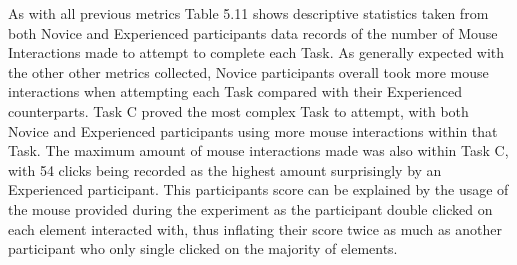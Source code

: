 As with all previous metrics Table 5.11 shows descriptive statistics taken from both Novice and Experienced participants data records of the number of Mouse Interactions made to attempt to complete each Task. As generally expected with the other other metrics collected, Novice participants overall took more mouse interactions when attempting each Task compared with their Experienced counterparts. Task C proved the most complex Task to attempt, with both Novice and Experienced participants using more mouse interactions within that Task. The maximum amount of mouse interactions made was also within Task C, with 54 clicks being recorded as the highest amount surprisingly by an Experienced participant. This participants score can be explained by the usage of the mouse provided during the experiment as the participant double clicked on each element interacted with, thus inflating their score twice as much as another participant who only single clicked on the majority of elements.






